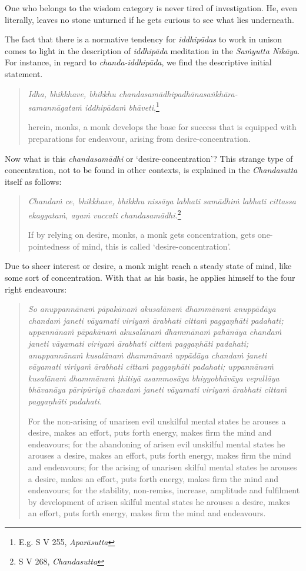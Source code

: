 One who belongs to the wisdom category is never tired of investigation. He, even literally, leaves no stone unturned if he gets curious to see what lies underneath.

The fact that there is a normative tendency for \emph{iddhipādas} to work in unison comes to light in the description of \emph{iddhipāda} meditation in the \emph{Saṁyutta Nikāya}. For instance, in regard to \emph{chanda-iddhipāda}, we find the descriptive initial statement.

\begin{quote}
\emph{Idha, bhikkhave, bhikkhu chandasamādhipadhānasaṅkhāra-\\ samannāgataṁ iddhipādaṁ bhāveti},\footnote{E.g. S V 255, \emph{Aparāsutta}}

herein, monks, a monk develops the base for success that is equipped with preparations for endeavour, arising from desire-concentration.
\end{quote}

Now what is this \emph{chandasamādhi} or `desire-concentration'? This strange type of concentration, not to be found in other contexts, is explained in the \emph{Chandasutta} itself as follows:

\begin{quote}
\emph{Chandaṁ ce, bhikkhave, bhikkhu nissāya labhati samādhiṁ labhati cittassa ekaggataṁ, ayaṁ vuccati chandasamādhi.}\footnote{S V 268, \emph{Chandasutta}}

If by relying on desire, monks, a monk gets concentration, gets one-pointedness of mind, this is called `desire-concentration'.
\end{quote}

Due to sheer interest or desire, a monk might reach a steady state of mind, like some sort of concentration. With that as his basis, he applies himself to the four right endeavours:

\begin{quote}
\emph{So anuppannānaṁ pāpakānaṁ akusalānaṁ dhammānaṁ anuppādāya chandaṁ janeti vāyamati viriyaṁ ārabhati cittaṁ paggaṇhāti padahati; uppannānaṁ pāpakānaṁ akusalānaṁ dhammānaṁ pahānāya chandaṁ janeti vāyamati viriyaṁ ārabhati cittaṁ paggaṇhāti padahati; anuppannānaṁ kusalānaṁ dhammānaṁ uppādāya chandaṁ janeti vāyamati viriyaṁ ārabhati cittaṁ paggaṇhāti padahati; uppannānaṁ kusalānaṁ dhammānaṁ ṭhitiyā asammosāya bhiyyobhāvāya vepullāya bhāvanāya pāripūriyā chandaṁ janeti vāyamati viriyaṁ ārabhati cittaṁ paggaṇhāti padahati.}

For the non-arising of unarisen evil unskilful mental states he arouses a desire, makes an effort, puts forth energy, makes firm the mind and endeavours; for the abandoning of arisen evil unskilful mental states he arouses a desire, makes an effort, puts forth energy, makes firm the mind and endeavours; for the arising of unarisen skilful mental states he arouses a desire, makes an effort, puts forth energy, makes firm the mind and endeavours; for the stability, non-remiss, increase, amplitude and fulfilment by development of arisen skilful mental states he arouses a desire, makes an effort, puts forth energy, makes firm the mind and endeavours.
\end{quote}

